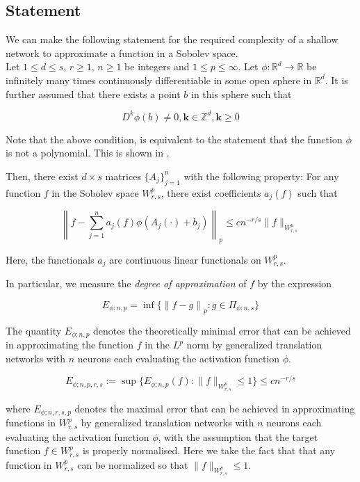 \documentclass[11pt,a4paper]{article}
\theoremstyle{plain}
\theoremstyle{definition}
\theoremstyle{remark}
\begin{document}
\subsection{Statement}


We can make the following statement for the required complexity of a shallow network to approximate a function in a Sobolev space.\\

Let \(1 \leq d \leq s\), \(r \geq 1\), \(n \geq 1\) be integers and \(1 \leq p \leq \infty\). Let \(\phi: \mathbb{R}^d \rightarrow \mathbb{R}\) be infinitely many times continuously differentiable in some open sphere in \(\mathbb{R}^d\). It is further assumed that there exists a point \(b\) in this sphere such that

\begin{equation}
    D^k \phi(b) \neq 0, \mathbf{k} \in \mathbb{Z}^d, \mathbf{k} \geq 0
    \label{derCondition}
\end{equation}

Note that the above condition, is equivalent to the statement that the function \(\phi\) is not a polynomial. This is shown in \cite{25Poggio}.

Then, there exist \(d \times s\) matrices \(\{A_j\}_{j=1}^n\) with the following property: For any function \(f\) in the Sobolev space \(W^p_{r,s}\), there exist coefficients \(a_j(f)\) such that

\begin{equation}
    \left\| f - \sum_{j=1}^{n} a_j(f) \phi(A_j(\cdot) + b_{j}) \right\|_p \leq c n^{-r/s} \|f\|_{W^{p}_{r,s}}
\end{equation}

Here, the functionals \(a_j\) are continuous linear functionals on \(W^p_{r,s}\).

In particular, we measure the \textit{degree of approximation} of \(f\) by the expression

   \[
    E_{\phi;n,p} = \inf\{ \left\| f - g \right\|_p : g \in \Pi_{\phi ; n,s} \}
   \]

   The quantity \(E_{\phi ; n,p}\)  denotes the theoretically minimal error that can be achieved in approximating the function \(f\)  in the \(L^p\)  norm by generalized translation networks with \(n\)  neurons each evaluating the activation function \(\phi \).

\[ E_{\phi ; n,p,r,s} := \sup\{E_{\phi ; n,p}(f) : \|f\|_{W^p_{r,s}} \leq 1\}  \leq c n^{-r/s} \]

where \( E_{\phi;n,r,s,p} \) denotes the maximal error that can be achieved in approximating functions in \(W^p_{r,s}\) by generalized translation networks with \(n\) neurons each evaluating the activation function \(\phi \), with the assumption that the target function \(f \in W^p_{r,s}\) is properly normalised. Here we take the fact that that any function in \(W^p_{r,s}\) can be normalized so that \( \|f\|_{W^p_{r,s}} \leq 1 \).
\end{document}
